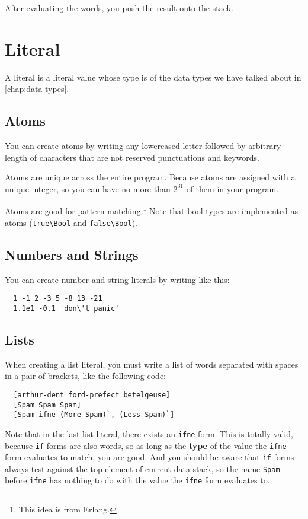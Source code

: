 \documentclass{book}
\begin{document}
After evaluating the words, you push the result onto the stack.

\section{Literal}

A literal is a literal value whose type is of the data types we have talked about in \autoref{chap:data-types}.

\subsection{Atoms}

You can create atoms by writing any lowercased letter followed by arbitrary length of characters that are not reserved punctuations and keywords.

Atoms are unique across the entire program. Because atoms are assigned with a unique integer, so you can have no more than $2^{31}$ of them in your program.


Atoms are good for pattern matching.\footnote{This idea is from Erlang.} Note that bool types are implemented as atoms (\texttt{true\textbackslash Bool} and \texttt{false\textbackslash Bool}).

\subsection{Numbers and Strings}

You can create number and string literals by writing like this:
\begin{verbatim}
  1 -1 2 -3 5 -8 13 -21
  1.1e1 -0.1 'don\'t panic'
\end{verbatim}

\subsection{Lists}

When creating a list literal, you must write a list of words separated with spaces in a pair of brackets, like the following code:
\begin{verbatim}
  [arthur-dent ford-prefect betelgeuse]
  [Spam Spam Spam]
  [Spam ifne (More Spam)`, (Less Spam)`]
\end{verbatim}

Note that in the last list literal, there exists an \texttt{ifne} form. This
is totally valid, because \texttt{if} forms are also words, so as long as the \textbf{type} of the value the \texttt{ifne} form evaluates to match, you are good. And you should be aware that \texttt{if} forms always test against the top element of current data stack, so the name \texttt{Spam} before \texttt{ifne} has nothing to do with the value the \texttt{ifne} form evaluates to.
\end{document}

